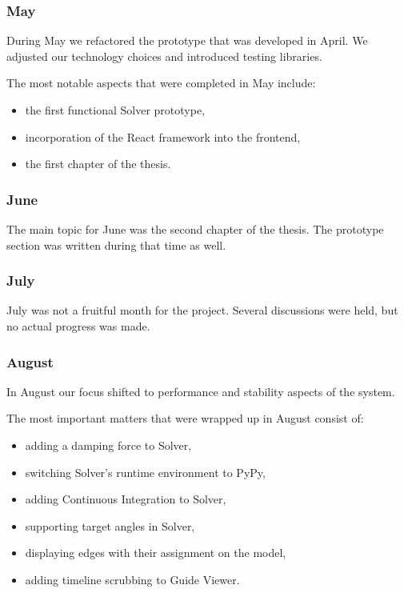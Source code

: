 \subsubsection{May}

During May we refactored the prototype that was developed in April. We adjusted our technology choices and introduced testing libraries.

The most notable aspects that were completed in May include:

\begin{itemize}
	\item the first functional Solver prototype,
	\item incorporation of the React framework into the frontend,
	\item the first chapter of the thesis. 
\end{itemize}

\subsubsection{June}

The main topic for June was the second chapter of the thesis. The prototype section was written during that time as well.

\subsubsection{July}

July was not a fruitful month for the project. Several discussions were held, but no actual progress was made.

\subsubsection{August}

In August our focus shifted to performance and stability aspects of the system. 

The most important matters that were wrapped up in August consist of:

\begin{itemize}
	\item adding a damping force to Solver,
	\item switching Solver's runtime environment to PyPy,
	\item adding Continuous Integration to Solver,
	\item supporting target angles in Solver,
	\item displaying edges with their assignment on the model,
	\item adding timeline scrubbing to Guide Viewer.
\end{itemize}

